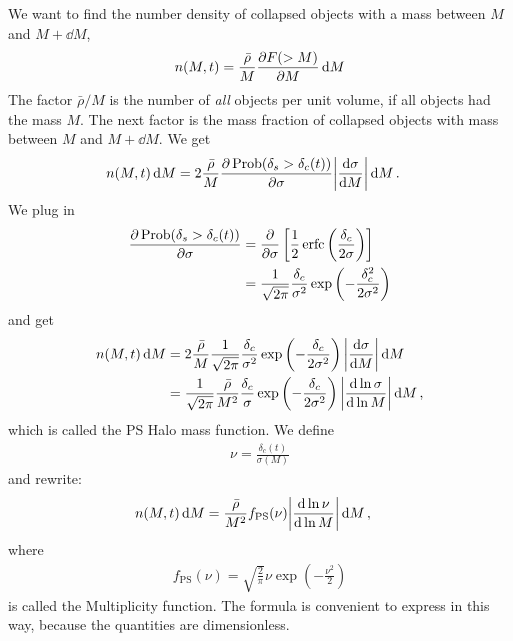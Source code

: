 We want to find the number density of collapsed objects with a mass between $M$ and $M + \dd{M}$,
\begin{align*}
	n(M, t)
	= \frac{\bar{\rho}}{M}
	\pdv{F(>M)}{M} \dd{M}
\end{align*}
The factor $\bar{\rho}/M$ is the number of \emph{all} objects per unit volume, if all objects had the mass $M$.
The next factor is the mass fraction of collapsed objects with mass between $M$ and $M+ \dd{M}$.
We get
\begin{align*}
	n(M, t) \dd{M}
	&= 2 \frac{\bar{\rho}}{M}
	\pdv{\Prob(\delta_s > \delta_c(t))}{\sigma}
	\abs*{ \dv{\sigma}{M} }
	\dd{M}.
\end{align*}
We plug in
\begin{align*}
	\pdv{\Prob(\delta_s > \delta_c(t))}{\sigma}
	&=
	\pdv{}{\sigma} \left[ 
		\frac{1}{2} \erfc \left( \frac{\delta_c}{2\sigma} \right)
	 \right]\\
	&= \frac{1}{\sqrt{2\pi}}
	\frac{\delta_c}{\sigma^2}
	\exp\left( - \frac{\delta_c^2}{2 \sigma^2} \right)
\end{align*}
and get
\begin{align*}
	n(M, t) \dd{M}
	&= 2 \frac{\bar{\rho}}{M}
	\frac{1}{\sqrt{2\pi}}
	\frac{\delta_c}{\sigma^2}
	\exp\left( -\frac{\delta_c}{2\sigma^2} \right)
	\abs*{\dv{\sigma}{M}} \dd{M}\\
	&= \frac{1}{\sqrt{2\pi}}
	\frac{\bar{\rho}}{M^2}
	\frac{\delta_c}{\sigma}
	\exp\left( -\frac{\delta_c}{2\sigma^2} \right)
	\abs*{\dv{\ln \sigma}{\ln M}}
	\dd{M},
\end{align*}
which is called the PS Halo mass function.
We define
\begin{align*}
	\nu = \frac{\delta_c(t)}{\sigma(M)}
\end{align*}
and rewrite:
\begin{align*}
	n(M, t) \dd{M}
	&= \frac{\bar{\rho}}{M^2} f_\text{PS}(\nu)
	\abs*{ \dv{\ln \nu}{\ln M} } \dd{M},
\end{align*}
where
\begin{align*}
	f_\text{PS}(\nu)
	= \sqrt{\frac{2}{\pi}} \nu \exp\left( - \frac{\nu^2}{2} \right)
\end{align*}
is called the Multiplicity function.
The formula is convenient to express in this way, because the quantities are dimensionless.

